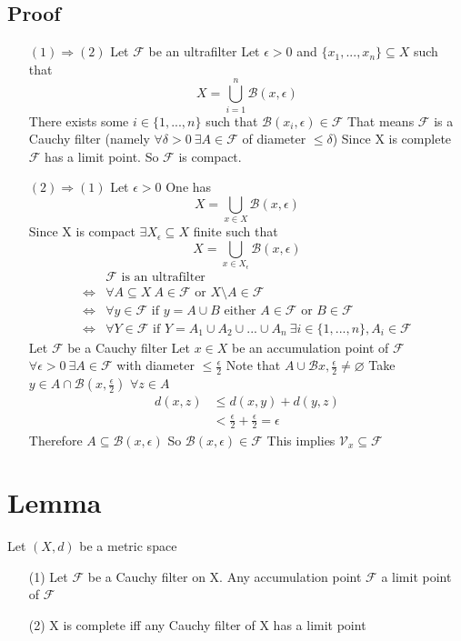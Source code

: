 \documentclass{book}
\begin{document}
\subsection*{Proof}
\begin{itemize}
    \item [$(1)\Rightarrow(2)$] Let $\mathcal{F}$ be an ultrafilter Let $\epsilon>0$ and $\{x_1,...,x_n\}\subseteq X$ such that $$X=\bigcup\limits_{i=1}^n\mathcal{B}(x,\epsilon)$$
    There exists some $i\in \{1,...,n\}$ such that $\mathcal{B}(x_i,\epsilon)\in \mathcal{F}$ That means $\mathcal{F}$ is a Cauchy filter (namely $\forall \delta>0\ \exists A\in \mathcal{F}$ of diameter $\leq\delta$) Since X is complete $\mathcal{F}$ has a limit point. So $\mathcal{F}$ is compact.
    \item [$(2)\Rightarrow(1)$] Let $\epsilon>0$ One has $$X=\bigcup\limits_{x\in X}\mathcal{B}(x,\epsilon)$$
    Since X is compact $\exists X_\epsilon\subseteq X$ finite such that$$X=\bigcup\limits_{x\in X_\epsilon}\mathcal{B}(x,\epsilon)$$
    $$
    \begin{aligned}
        & \mathcal{F}\text{ is an ultrafilter}
        \\\Leftrightarrow &\forall A\subseteq X\ A\in \mathcal{F} \text{ or }X\setminus A\in \mathcal{F}\\
        \Leftrightarrow &\forall y\in \mathcal{F}\text{ if }y=A\cup B\text{ either }A\in \mathcal{F}\text{ or }B\in \mathcal{F} \\
        \Leftrightarrow &\forall Y\in \mathcal{F}\text{ if }Y=A_1\cup A_2\cup...\cup A_n\ \exists i\in \{1,...,n\},A_i\in \mathcal{F}
    \end{aligned}
    $$ 
    Let $\mathcal{F}$ be a Cauchy filter Let $x\in X$ be an accumulation point of $\mathcal{F}$ $\forall \epsilon>0\ \exists A\in \mathcal{F}$ with diameter $\leq\frac{\epsilon}{2}$ Note that $A\cup \mathcal{B}x,\frac{\epsilon}{2}\neq\varnothing$ Take $y\in A\cap\mathcal{B}(x,\frac{\epsilon}{2})$ $\forall z\in A$ 
    $$
    \begin{aligned}
        d(x,z) &\leq d(x,y)+d(y,z)\\
        &< \frac{\epsilon}{2}+\frac{\epsilon}{2}=\epsilon
    \end{aligned}
    $$
    Therefore $A\subseteq \mathcal{B}(x,\epsilon)$ So $\mathcal{B}(x,\epsilon)\in\mathcal{F}$ This implies $\mathcal{V}_x\subseteq \mathcal{F}$
\end{itemize}
\section{Lemma}
Let $(X,d)$ be a metric space 
\begin{itemize}
    \item [(1)]Let $\mathcal{F}$ be a Cauchy filter on X. Any accumulation point $\mathcal{F}$ a limit point of $\mathcal{F}$
    \item [(2)]X is complete iff any Cauchy filter of X has a limit point
\end{itemize}
\end{document}
